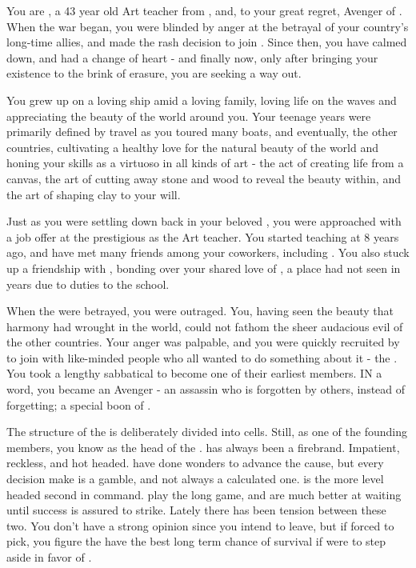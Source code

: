 \documentclass[char]{GL2020}
\begin{document}
\name{\cChupAvenger{}}


You are \cChupAvenger{}, a 43 year old Art teacher from \pShip{}, and, to your great regret, Avenger of \pGoat{}. When the war began, you were blinded by anger at the betrayal of your country’s long-time allies, and made the rash decision to join \pGoaties{}. Since then, you have calmed down, and had a change of heart - and finally now, only after bringing your existence to the brink of erasure, you are seeking a way out.

You grew up on a loving ship amid a loving family, loving life on the waves and appreciating the beauty of the world around you. Your teenage years were primarily defined by travel as you toured many boats, and eventually, the other countries, cultivating a healthy love for the natural beauty of the world and honing your skills as a virtuoso in all kinds of art - the act of creating life from a canvas, the art of cutting away stone and wood to reveal the beauty within, and the art of shaping clay to your will. 

Just as you were settling down back in your beloved \pShip{}, you were approached with a job offer at the prestigious \pSchool{} as the Art teacher. You started teaching at \pSchool{} 8 years ago, and have met many friends among your coworkers, including \cLibrarian{}. You also stuck up a friendship with \cPrincipal{}, bonding over your shared love of \pShip{}, a place \cPrincipal{\they} had not seen in years due to \cPrincipal{\their} duties to the school.

When the \pShip{} were betrayed, you were outraged. You, having seen the beauty that harmony had wrought in the world, could not fathom the sheer audacious evil of the other countries. Your anger was palpable, and you were quickly recruited by \cChupSecond{} to join with like-minded people who all wanted to do something about it - the \pGoaties{}. You took a lengthy sabbatical to become one of their earliest members. IN a word, you became an Avenger - an assassin who is forgotten by others, instead of forgetting; a special boon of \cGenesis{}.

The structure of the \pGoaties{} is deliberately divided into cells. Still, as one of the founding members, you know \cChupLeader{} as the head of the \pGoaties{}. \cChupLeader{} has always been a firebrand. Impatient, reckless, and hot headed. \cChupLeader{\They} have done wonders to advance the \pGoaties{} cause, but every decision \cChupLeader{\they} make\cChupLeader{\plural} is a gamble, and not always a calculated one. \cChupSecond{} is the more level headed second in command. \cChupSecond{\They} play\cChupLeader{\plural} the long game, and are much better at waiting until success is assured to strike. Lately there has been tension between these two. You don’t have a strong opinion since you intend to leave, but if forced to pick, you figure the \pGoaties{} have the best long term chance of survival if \cChupLeader{} were to step aside in favor of \cChupSecond{}. 
\end{document}
